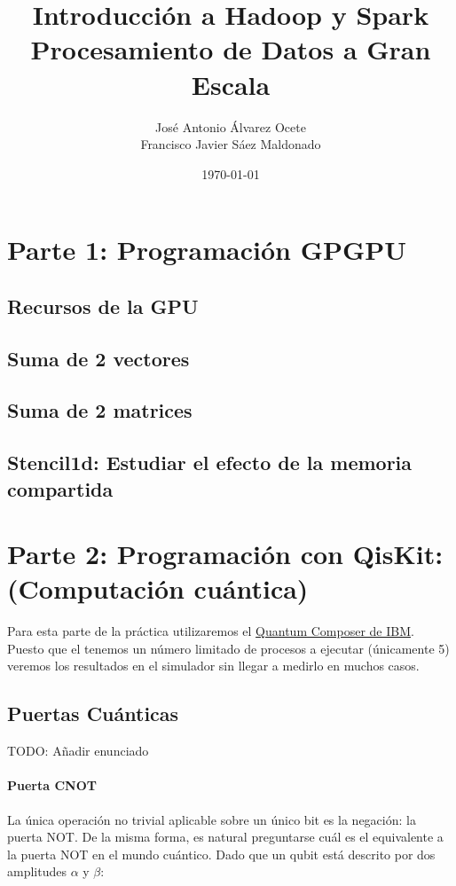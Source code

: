 \documentclass[11pt]{article}
\author{José Antonio Álvarez Ocete\\ Francisco Javier Sáez Maldonado}
\date{\today}
\title{Introducción a Hadoop y Spark\\\medskip
\large Procesamiento de Datos a Gran Escala}
\begin{document}
\maketitle

\tableofcontents

\section{Parte 1: Programación GPGPU}

\subsection{Recursos de la GPU}
\subsection{Suma de 2 vectores}
\subsection{Suma de 2 matrices}
\subsection{Stencil1d: Estudiar el efecto de la memoria compartida}

\section{Parte 2: Programación con QisKit: (Computación cuántica)}

Para esta parte de la práctica utilizaremos el \href{https://quantum-computing.ibm.com/composer}{Quantum Composer de IBM}. Puesto que el tenemos un número limitado de procesos a ejecutar (únicamente 5) veremos los resultados en el simulador sin llegar a medirlo en muchos casos.

\subsection{Puertas Cuánticas}

TODO: Añadir enunciado


\paragraph*{Puerta CNOT}

La única operación no trivial aplicable sobre un único bit es la negación: la puerta NOT. De la misma forma, es natural preguntarse cuál es el equivalente a la puerta NOT en el mundo cuántico. Dado que un qubit está descrito por dos amplitudes $\alpha$ y $\beta$:
\end{document}
